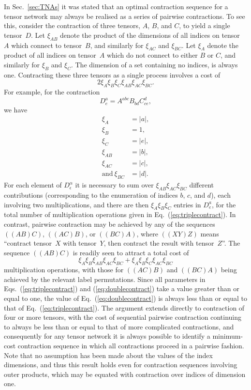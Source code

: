 \documentclass[aps,pre,reprint,superscriptaddress,amsfonts,amsmath,showpacs,nofootinbib,floatfix]{revtex4-1}
\newcommand{\mrm}[1]{\mathrm{#1}}
\newcommand{\Eref}[1]{Eq.~(\ref{#1})}
\newcommand{\Erefs}[2]{Eqs.~(\ref{#1}) and (\ref{#2})}
\newcommand{\sref}[1]{Sec.~\ref{#1}}
\begin{document}
In \sref{sec:TNAs} it was stated that an optimal contraction sequence for a tensor network may always be realised as a series of pairwise contractions. To see this, consider the contraction of three tensors, $A$, $B$, and $C$, to yield a single tensor~$D$. Let $\xi_{AB}$ denote the product of the dimensions of all indices on tensor~$A$ which connect to tensor~$B$, and similarly for $\xi_{AC}$ and $\xi_{BC}$. Let $\xi_A$ denote the product of all indices on tensor~$A$ which do not connect to either $B$ or $C$, and similarly for $\xi_B$ and $\xi_C$. The dimension of a set containing no indices, is always one. Contracting these three tensors as a single process involves a cost of
\begin{equation}
2\xi_A\xi_B\xi_C\xi_{AB}\xi_{AC}\xi_{BC}.\label{eq:triplecontract}
\end{equation}
For example, for the contraction
\begin{equation}
D^{a}_{e}=A^{abc}B_{bd}C^{d}_{ce},
\end{equation}
we have
\begin{equation}
\begin{split}
\xi_A&=|a|,\\ \xi_B&=1,\\ \xi_C&=|e|,\\ \xi_{AB}&=|b|,\\
\xi_{AC}&=|c|, \\\mrm{and}~\xi_{BC}&=|d|.
\end{split}
\end{equation}
For each element of $D^\alpha_\epsilon$ it is necessary to sum over $\xi_{AB}\xi_{AC}\xi_{BC}$ different contributions (corresponding to the enumeration of indices $b$, $c$, and $d$), each involving two multiplications, and there are then $\xi_A\xi_B\xi_C$ entries in $D^a_e$, for the total number of multiplication operations given in \Eref{eq:triplecontract}.
In contrast, pairwise contraction may be achieved by any of the sequences $((AB)C)$, $((AC)B)$, or $((BC)A)$, where $((XY)Z)$ means ``contract tensor~$X$ with tensor~$Y$, then contract the result with tensor~$Z$''. The sequence $((AB)C)$ is readily seen to attract a total cost of
\begin{equation}
\xi_A\xi_B\xi_{AB}\xi_{AC}\xi_{BC} + \xi_A\xi_B\xi_C\xi_{AC}\xi_{BC}\label{eq:doublecontract}
\end{equation}
multiplication operations, with those for $((AC)B)$ and $((BC)A)$ being achieved by the relevant label permutations. Since all parameters in \Erefs{eq:triplecontract}{eq:doublecontract} take a value greater than or equal to one, the value of \Eref{eq:doublecontract} is always less than or equal to that of \Eref{eq:triplecontract}. The argument extends directly to contraction of four or more tensors, with the cost of sequential pairwise contraction continuing to always be less than or equal to that of more complicated contractions, and consequently for any tensor network it is always possible to identify a minimum-cost contraction sequence in which all contractions proceed in a pairwise fashion. Note that no assumption has been made about the values of the index dimensions, and thus this result holds even for contraction sequences involving outer products, which may be equated with contraction over indices of dimension one.
\end{document}
